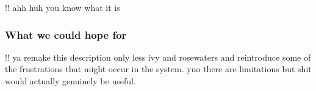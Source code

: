 \documentclass[10pt]{article}
\begin{document}
\begin{multicols}{2}
!! ahh huh you know what it is

\hypertarget{what-we-could-hope-for}{%
\subsubsection{What we could hope for}\label{what-we-could-hope-for}}

!! ya remake this description only less ivy and rosewaters and
reintroduce some of the frustrations that might occur in the system. yno
there are limitations but shit would actually genuinely be useful.

\end{multicols}


 
\end{document}
